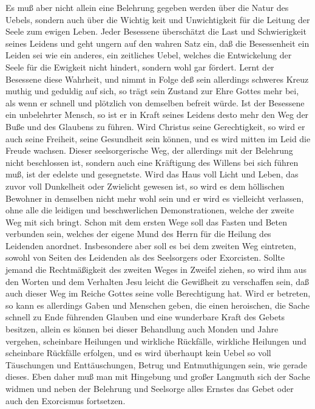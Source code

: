 Es muß aber nicht allein eine Belehrung gegeben werden über die Natur des Uebels, sondern auch über die Wichtig%
keit und Unwichtigkeit für die Leitung der Seele zum ewigen Leben. Jeder Besessene überschätzt die Last und Schwierigkeit seines Leidens und geht ungern auf den wahren Satz ein, daß die Besessenheit ein Leiden sei wie ein anderes, ein zeitliches Uebel, welches die Entwickelung der Seele für die Ewigkeit nicht hindert, sondern wohl gar fördert. Lernt der Besessene diese Wahrheit, und nimmt in Folge deß sein allerdings schweres Kreuz muthig und geduldig auf sich, so trägt sein Zustand zur Ehre Gottes mehr bei, als wenn er schnell und plötzlich von demselben befreit würde. Ist der Besessene ein unbelehrter Mensch, so ist er in Kraft seines Leidens desto mehr den Weg der Buße und des Glaubens zu führen. Wird Christus seine Gerechtigkeit, so wird er auch seine Freiheit, seine Gesundheit sein können, und es wird mitten im Leid die Freude wachsen. Dieser seelsorgerische Weg, der allerdings mit der Belehrung nicht beschlossen ist, sondern auch eine Kräftigung des Willens bei sich führen muß, ist der edelste und gesegnetste. Wird das Haus voll Licht und Leben, das zuvor voll Dunkelheit oder Zwielicht gewesen ist, so wird es dem höllischen Bewohner in demselben nicht mehr wohl sein und er wird es vielleicht verlassen, ohne alle die leidigen und beschwerlichen Demonstrationen, welche der zweite Weg mit sich bringt. Schon mit dem ersten Wege soll das Fasten und Beten verbunden sein, welches der eigene Mund des Herrn für die Heilung des Leidenden anordnet. Insbesondere aber soll es bei dem zweiten Weg eintreten, sowohl von Seiten des Leidenden als des Seelsorgers oder Exorcisten. Sollte jemand die Rechtmäßigkeit des zweiten Weges in Zweifel ziehen, so
wird ihm aus den Worten und dem Verhalten Jesu leicht die Gewißheit zu verschaffen sein, daß auch dieser Weg im Reiche Gottes seine volle Berechtigung hat. Wird er betreten, so kann es allerdings Gaben und Menschen geben, die einen heroischen, die Sache schnell zu Ende führenden Glauben und eine wunderbare Kraft des Gebets besitzen, allein es können bei dieser Behandlung auch Monden und Jahre vergehen, scheinbare Heilungen und wirkliche Rückfälle, wirkliche Heilungen und scheinbare Rückfälle erfolgen, und es wird überhaupt kein Uebel so voll Täuschungen und Enttäuschungen, Betrug und Entmuthigungen sein, wie gerade dieses. Eben daher muß man mit Hingebung und großer Langmuth sich der Sache widmen und neben der Belehrung und Seelsorge alles Ernstes das Gebet oder auch den Exorcismus fortsetzen.

